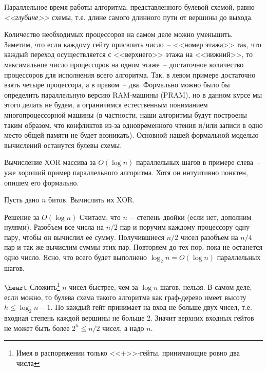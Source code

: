 \begin{definition*}
Параллельное время работы алгоритма, представленного булевой схемой,
равно
\textit{<<глубине>>} схемы, т.е. длине самого длинного пути от вершины до выхода.
\end{definition*}

Количество необходимых процессоров на самом деле можно уменьшить.
Заметим, что если каждому гейту присвоить число~-- <<номер этажа>> так, что каждый переход осуществляется с <<верхнего>> этажа на <<нижний>>, то максимальное число процессоров на одном этаже~-- достаточное количество процессоров для исполнения всего алгоритма. Так, в левом примере достаточно взять четыре процессора, а в правом~-- два.
Формально можно было бы определить параллельную версию RAM-машины (PRAM), 
но в данном курсе мы этого делать не будем,
а ограничимся естественным пониманием многопроцессорной машины
(в частности, наши алгоритмы будут построены таким образом, что
конфликтов из-за одновременного чтения и/или записи
в одно место общей памяти не будет возникать).
Основной нашей формальной моделью вычислений останутся булевы схемы.

Вычисление XOR массива за $O(\log n)$ параллельных шагов в примере слева~-- уже хороший пример параллельного алгоритма. Хотя он интуитивно понятен, опишем его формально.

\begin{problem*}
	Пусть дано $n$ битов. Вычислить их XOR.
\end{problem*}

\begin{algodescription}{Решение за $O(\log n)$} Считаем, что $n$~-- степень двойки (если нет, дополним нулями).  Разобъем все числа на $n/2$ пар и поручим каждому процессору одну пару, чтобы он вычислил ее сумму. Получившиеся $n/2$ чисел разобъем на $n/4$ пар и так же вычислим суммы этих пар. Повторяем до тех пор, пока не останется одно число. Ясно, что всего будет выполнено $\log_2 n = O(\log n)$ параллельных шагов. 
\end{algodescription}

\begin{nb*} $\heart$ Сложить\footnote{Имея в распоряжении только <<+>>-гейты, принимающие ровно два числа} $n$ чисел быстрее, чем за $\log n$ шагов, нельзя. В самом деле, если можно, то булева схема такого алгоритма как граф-дерево имеет высоту $h \leq \log_2 n - 1$. Но каждый гейт принимает на вход не больше двух чисел, т.е. входная степень каждой вершины не больше 2. Значит верхних входных гейтов не может быть более $2^h \leq n/2$  чисел, а надо $n$.
\end{nb*}

